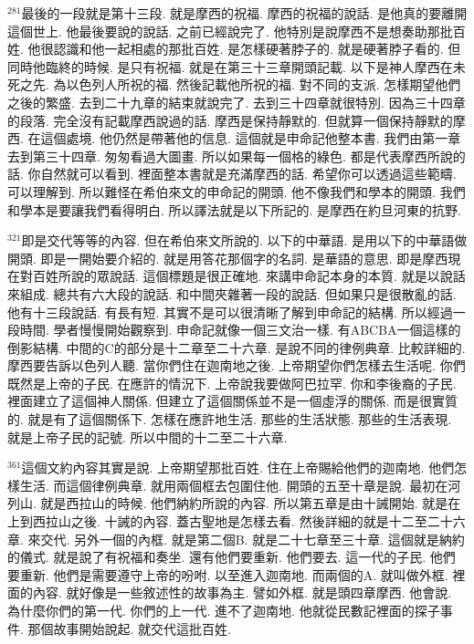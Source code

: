 \documentclass{book}
\begin{document}
$^{281}$最後的一段就是第十三段.
就是摩西的祝福.
摩西的祝福的說話.
是他真的要離開這個世上.
他最後要說的說話.
之前已經說完了.
他特別是說摩西不是想奏助那批百姓.
他很認識和他一起相處的那批百姓.
是怎樣硬著脖子的.
就是硬著脖子看的.
但同時他臨終的時候.
是只有祝福.
就是在第三十三章開頭記載.
以下是神人摩西在未死之先.
為以色列人所祝的福.
然後記載他所祝的福.
對不同的支派.
怎樣期望他們之後的繁盛.
去到二十九章的結束就說完了.
去到三十四章就很特別.
因為三十四章的段落.
完全沒有記載摩西說過的話.
摩西是保持靜默的.
但就算一個保持靜默的摩西.
在這個處境.
他仍然是帶著他的信息.
這個就是申命記他整本書.
我們由第一章去到第三十四章.
匆匆看過大圖畫.
所以如果每一個格的綠色.
都是代表摩西所說的話.
你自然就可以看到.
裡面整本書就是充滿摩西的話.
希望你可以透過這些範疇.
可以理解到.
所以難怪在希伯來文的申命記的開頭.
他不像我們和學本的開頭.
我們和學本是要讓我們看得明白.
所以譯法就是以下所記的.
是摩西在約旦河東的抗野.

$^{321}$即是交代等等的內容.
但在希伯來文所說的.
以下的中華語.
是用以下的中華語做開頭.
即是一開始要介紹的.
就是用答花那個字的名詞.
是華語的意思.
即是摩西現在對百姓所說的眾說話.
這個標題是很正確地.
來講申命記本身的本質.
就是以說話來組成.
總共有六大段的說話.
和中間夾雜著一段的說話.
但如果只是很散亂的話.
他有十三段說話.
有長有短.
其實不是可以很清晰了解到申命記的結構.
所以經過一段時間.
學者慢慢開始觀察到.
申命記就像一個三文治一樣.
有ABCBA一個這樣的倒影結構.
中間的C的部分是十二章至二十六章.
是說不同的律例典章.
比較詳細的.
摩西要告訴以色列人聽.
當你們住在迦南地之後.
上帝期望你們怎樣去生活呢.
你們既然是上帝的子民.
在應許的情況下.
上帝說我要做阿巴拉罕.
你和李後裔的子民.
裡面建立了這個神人關係.
但建立了這個關係並不是一個虛浮的關係.
而是很實質的.
就是有了這個關係下.
怎樣在應許地生活.
那些的生活狀態.
那些的生活表現.
就是上帝子民的記號.
所以中間的十二至二十六章.

$^{361}$這個文約內容其實是說.
上帝期望那批百姓.
住在上帝賜給他們的迦南地.
他們怎樣生活.
而這個律例典章.
就用兩個框去包圍住他.
開頭的五至十章是說.
最初在河列山.
就是西拉山的時候.
他們納約所說的內容.
所以第五章是由十誡開始.
就是在上到西拉山之後.
十誡的內容.
蓋古聖地是怎樣去看.
然後詳細的就是十二至二十六章.
來交代.
另外一個的內框.
就是第二個B.
就是二十七章至三十章.
這個就是納約的儀式.
就是說了有祝福和奏坐.
還有他們要重新.
他們要去.
這一代的子民.
他們要重新.
他們是需要遵守上帝的吩咐.
以至進入迦南地.
而兩個的A.
就叫做外框.
裡面的內容.
就好像是一些敘述性的故事為主.
譬如外框.
就是頭四章摩西.
他會說.
為什麼你們的第一代.
你們的上一代.
進不了迦南地.
他就從民數記裡面的探子事件.
那個故事開始說起.
就交代這批百姓.
\end{document}
